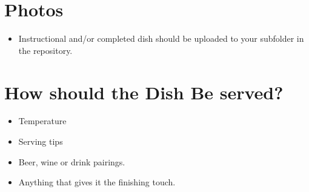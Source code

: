 \documentclass[letterpaper,10pt,english]{sphinxmanual}
\begin{document}
\section{Photos}
\label{\detokenize{_source/submissions:photos}}\begin{itemize}
\item {} 
Instructional and/or completed dish should be uploaded to your sub\sphinxhyphen{}folder in the repository.

\end{itemize}


\section{How should the Dish Be served?}
\label{\detokenize{_source/submissions:how-should-the-dish-be-served}}\begin{itemize}
\item {} 
Temperature

\item {} 
Serving tips

\item {} 
Beer, wine or drink pairings.

\item {} 
Anything that gives it the finishing touch.

\end{itemize}



\renewcommand{\indexname}{Index}
\printindex
\end{document}
